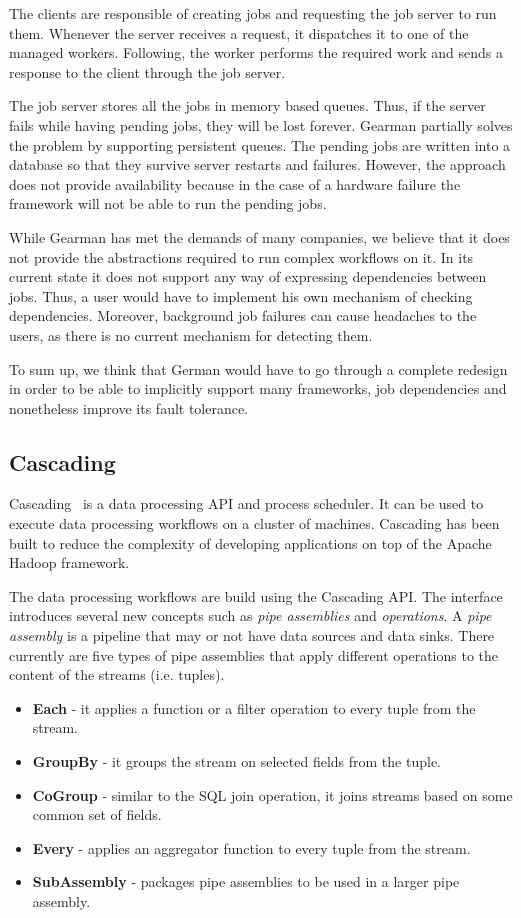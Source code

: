 \documentclass[11pt,a4paper,twoside]{report}
\begin{document}
The clients are responsible of creating jobs and requesting the job server to run them. Whenever the server receives a request, it dispatches it to one of the managed workers. Following, the worker performs the required work and sends a response to the client through the job server.


The job server stores all the jobs in memory based queues. Thus, if the server fails while having pending jobs, they will be lost forever. Gearman partially solves the problem by supporting persistent queues. The pending jobs are written into a database so that they survive server restarts and failures. However, the approach does not provide availability because in the case of a hardware failure the framework will not be able to run the pending jobs.


While Gearman has met the demands of many companies, we believe that it does not provide the abstractions required to run complex workflows on it. In its current state it does not support any way of expressing dependencies between jobs. Thus, a user would have to implement his own mechanism of checking dependencies. Moreover, background job failures can cause headaches to the users, as there is no current mechanism for detecting them.


To sum up, we think that German would have to go through a complete redesign in order to be able to implicitly support many frameworks, job dependencies and nonetheless improve its fault tolerance.

\subsection{Cascading}
Cascading~\cite{Cascading} is a data processing API and process scheduler. It can be used to execute data processing workflows on a cluster of machines. Cascading has been built to reduce the complexity of developing applications on top of the Apache Hadoop framework. 


The data processing workflows are build using the Cascading API. The interface introduces several new concepts such as \textit{pipe assemblies} and \textit{operations}. A \textit{pipe assembly} is a pipeline that may or not have data sources and data sinks. There currently are five types of pipe assemblies that apply different operations to the content of the streams (i.e. tuples).

\begin{itemize}
\item{}
\textbf{Each} - it applies a function or a filter operation to every tuple from the stream.
\item{}
\textbf{GroupBy} - it groups the stream on selected fields from the tuple.
\item{}
\textbf{CoGroup} - similar to the SQL join operation, it joins streams based on some common set of fields.
\item{}
\textbf{Every} - applies an aggregator function to every tuple from the stream.
\item{}
\textbf{SubAssembly} - packages pipe assemblies to be used in a larger pipe  assembly.
\end{itemize}
\end{document}
